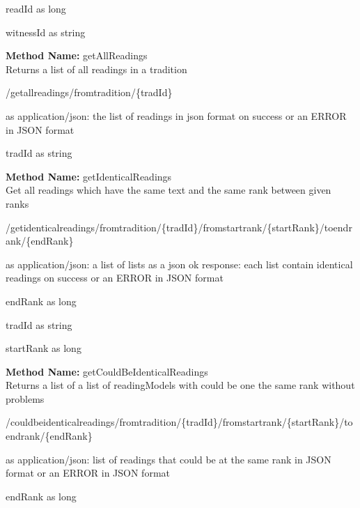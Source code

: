 \begin{parameter}
readId as long
\end{parameter}
\begin{parameter}
witnessId as string
\end{parameter}
\textbf{Method Name: }getAllReadings \\ Returns a list of all readings in a tradition
\begin{get}
/getallreadings/fromtradition/\{tradId\}
\end{get}
\begin{response}
 as application/json: the list of readings in json format on success or an ERROR in JSON format
\end{response}
\begin{parameter}
tradId as string
\end{parameter}
\textbf{Method Name: }getIdenticalReadings \\ Get all readings which have the same text and the same rank between given ranks
\begin{get}
/getidenticalreadings/fromtradition/\{tradId\}/fromstartrank/\{startRank\}/toendrank/\{endRank\}
\end{get}
\begin{response}
 as application/json: a list of lists as a json ok response: each list contain identical readings on success or an ERROR in JSON format
\end{response}
\begin{parameter}
endRank as long
\end{parameter}
\begin{parameter}
tradId as string
\end{parameter}
\begin{parameter}
startRank as long
\end{parameter}
\textbf{Method Name: }getCouldBeIdenticalReadings \\ Returns a list of a list of readingModels with could be one the same rank without problems
\begin{get}
/couldbeidenticalreadings/fromtradition/\{tradId\}/fromstartrank/\{startRank\}/toendrank/\{endRank\}
\end{get}
\begin{response}
 as application/json: list of readings that could be at the same rank in JSON format or an ERROR in JSON format
\end{response}
\begin{parameter}
endRank as long
\end{parameter}
